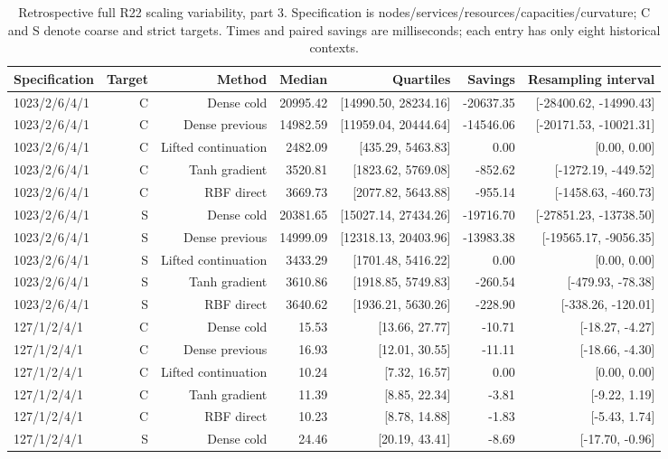\documentclass[11pt,letterpaper]{article}
\theoremstyle{definition}
\newcommand{\1}{\mathbf 1}
\begin{document}
\begin{table}[tbp]\centering\scriptsize
\caption{Retrospective full R22 scaling variability, part 3. Specification is nodes/services/resources/capacities/curvature; C and S denote coarse and strict targets. Times and paired savings are milliseconds; each entry has only eight historical contexts.}
\label{tab:r24-old-scaling-3}
\begin{tabular}{lrrrrrr}
\toprule
Specification & Target & Method & Median & Quartiles & Savings & Resampling interval\\
\midrule
1023/2/6/4/1 & C & Dense cold & 20995.42 & [14990.50, 28234.16] & -20637.35 & [-28400.62, -14990.43]\\
1023/2/6/4/1 & C & Dense previous & 14982.59 & [11959.04, 20444.64] & -14546.06 & [-20171.53, -10021.31]\\
1023/2/6/4/1 & C & Lifted continuation & 2482.09 & [435.29, 5463.83] & 0.00 & [0.00, 0.00]\\
1023/2/6/4/1 & C & Tanh gradient & 3520.81 & [1823.62, 5769.08] & -852.62 & [-1272.19, -449.52]\\
1023/2/6/4/1 & C & RBF direct & 3669.73 & [2077.82, 5643.88] & -955.14 & [-1458.63, -460.73]\\
1023/2/6/4/1 & S & Dense cold & 20381.65 & [15027.14, 27434.26] & -19716.70 & [-27851.23, -13738.50]\\
1023/2/6/4/1 & S & Dense previous & 14999.09 & [12318.13, 20403.96] & -13983.38 & [-19565.17, -9056.35]\\
1023/2/6/4/1 & S & Lifted continuation & 3433.29 & [1701.48, 5416.22] & 0.00 & [0.00, 0.00]\\
1023/2/6/4/1 & S & Tanh gradient & 3610.86 & [1918.85, 5749.83] & -260.54 & [-479.93, -78.38]\\
1023/2/6/4/1 & S & RBF direct & 3640.62 & [1936.21, 5630.26] & -228.90 & [-338.26, -120.01]\\
127/1/2/4/1 & C & Dense cold & 15.53 & [13.66, 27.77] & -10.71 & [-18.27, -4.27]\\
127/1/2/4/1 & C & Dense previous & 16.93 & [12.01, 30.55] & -11.11 & [-18.66, -4.30]\\
127/1/2/4/1 & C & Lifted continuation & 10.24 & [7.32, 16.57] & 0.00 & [0.00, 0.00]\\
127/1/2/4/1 & C & Tanh gradient & 11.39 & [8.85, 22.34] & -3.81 & [-9.22, 1.19]\\
127/1/2/4/1 & C & RBF direct & 10.23 & [8.78, 14.88] & -1.83 & [-5.43, 1.74]\\
127/1/2/4/1 & S & Dense cold & 24.46 & [20.19, 43.41] & -8.69 & [-17.70, -0.96]\\

\end{tabular}
\end{table}
\end{document}
